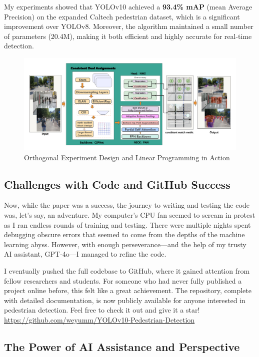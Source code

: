 \documentclass[a4paper]{article} 	%
\begin{document}
My experiments showed that YOLOv10 achieved a \textbf{93.4\% mAP} (mean Average Precision) on the expanded Caltech pedestrian dataset, which is a significant improvement over YOLOv8. Moreover, the algorithm maintained a small number of parameters (20.4M), making it both efficient and highly accurate for real-time detection.

\begin{figure}[h!]
	\centering
	\includegraphics[width=1.0\textwidth]{fig0033.png}  %
	\caption{Orthogonal Experiment Design and Linear Programming in Action}
	\label{fig:0031}
\end{figure}

\subsection*{Challenges with Code and GitHub Success}

Now, while the paper was a success, the journey to writing and testing the code was, let’s say, an adventure. My computer’s CPU fan seemed to scream in protest as I ran endless rounds of training and testing. There were multiple nights spent debugging obscure errors that seemed to come from the depths of the machine learning abyss. However, with enough perseverance—and the help of my trusty AI assistant, GPT-4o—I managed to refine the code.

I eventually pushed the full codebase to GitHub, where it gained attention from fellow researchers and students. For someone who had never fully published a project online before, this felt like a great achievement. The repository, complete with detailed documentation, is now publicly available for anyone interested in pedestrian detection. Feel free to check it out and give it a star! \url{https://github.com/weyumm/YOLOv10-Pedestrian-Detection}

\subsection*{The Power of AI Assistance and Perspective}
\end{document}
